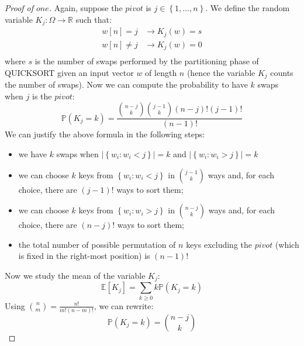 \begin{proof}[Proof of $one$]
  Again, suppose the $pivot$ is $j \in \left \lbrace
    1,\ldots,n \right\rbrace $. We define the random variable $K_j:
  \Omega \rightarrow \mathbb{R}$ such that:
  \begin{displaymath}
    \begin{split}
      w[n] = j &\rightarrow K_j(w) = s \\
      w[n] \not= j &\rightarrow K_j(w) = 0 \\
    \end{split}
  \end{displaymath}
  where $s$ is the number of swaps performed by the partitioning phase
  of QUICKSORT given an input vector $w$ of length $n$ (hence the
  variable $K_j$ counts the number of swaps). Now we can compute the
  probability to have $k$ swaps when $j$ is the $pivot$:
  \begin{displaymath}
    \mathbb{P}\left(K_j = k \right) =  \frac{{{n-j}\choose{k}}
      {{j-1}\choose{k}} (n-j)! (j-1)! }{(n-1)!} 
  \end{displaymath}
  We can justify the above formula in the following steps:
  \begin{itemize}
  \item we have $k$ swaps when $\left| \left \lbrace
        w_i : w_i < j \right\rbrace \right| = k$ and
    $\left| \left \lbrace
        w_i : w_i > j \right\rbrace \right| = k$
  \item we can choose $k$ keys from $\left \lbrace w_i : w_i < j
    \right\rbrace$ in ${{j-1}\choose{k}}$ ways and, for each choice,
    there are $(j-1)!$ ways to sort them;
  \item we can choose $k$ keys from $\left \lbrace w_i : w_i > j
    \right\rbrace$ in ${{n-j}\choose{k}}$ ways and, for each choice,
    there are $(n-j)!$ ways to sort them;
  \item the total number of possible permutation of $n$ keys excluding
    the $pivot$ (which is fixed in the right-most position) is
    $(n-1)!$
  \end{itemize}
  Now we study the mean of the variable $K_j$:
  \begin{displaymath}
    \mathbb{E} \left[ K_j \right] = \sum_{k \geq 0}{k \mathbb{P}\left(
        K_j = k      \right) } 
  \end{displaymath}
  Using ${{n}\choose{m}} =  \frac{n!}{m!(n-m)!} $, we can rewrite:
  \begin{displaymath}
    \mathbb{P}\left(K_j = k \right) =  {{n-j}\choose{k}}

\end{displaymath}
\end{proof}
